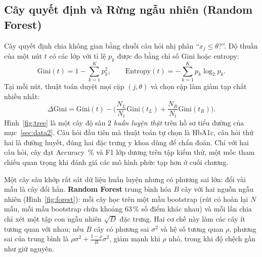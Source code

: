 
\subsection{Cây quyết định và Rừng ngẫu nhiên (Random Forest)}

Cây quyết định chia không gian bằng chuỗi câu hỏi nhị phân “$x_j \le \theta$?”. Độ thuần của một nút $t$ có các lớp với tỉ
lệ $p_k$ được đo bằng chỉ số Gini hoặc entropy:
\begin{equation}
  \mathrm{Gini}(t) = 1 - \sum_{k=1}^{K} p_k^2, \qquad \mathrm{Entropy}(t) = -\sum_{k=1}^{K} p_k\log_2 p_k .
\end{equation}
Tại mỗi nút, thuật toán duyệt mọi cặp $(j, \theta)$ và chọn cặp làm giảm tạp chất nhiều nhất:
\begin{equation}
  \Delta\mathrm{Gini} = \mathrm{Gini}(t) - \Big(\frac{N_L}{N_t}\mathrm{Gini}(t_L) + \frac{N_R}{N_t}\mathrm{Gini}(t_R)\Big).
\end{equation}
Hình~\ref{fig:tree} là một cây độ sâu 2 \emph{huấn luyện thật} trên  hồ sơ tiểu đường của
mục~\ref{sec:data2}. Câu hỏi đầu tiên mà thuật toán tự chọn là HbA1c, câu hỏi thứ hai là đường huyết, đúng hai đặc trưng
y khoa dùng để chẩn đoán. Chỉ với hai câu hỏi, cây đạt Accuracy \,\% và F1 lớp dương
 trên tập kiểm thử, một mốc tham chiếu quan trọng khi đánh giá các mô hình phức tạp hơn ở cuối
chương.


Một cây sâu khớp rất sát dữ liệu huấn luyện nhưng có phương sai lớn: đổi vài mẫu là cây đổi hẳn. \textbf{Random Forest}
\cite{breiman2001} trung bình hóa $B$ cây với hai nguồn ngẫu nhiên (Hình~\ref{fig:forest}): mỗi cây học trên một mẫu
bootstrap (rút có hoàn lại $N$ mẫu, mỗi mẫu bootstrap chứa khoảng 63\,\% số điểm khác nhau) và mỗi lần chia chỉ xét một
tập con ngẫu nhiên $\sqrt{D}$ đặc trưng. Hai cơ chế này làm các cây ít tương quan với nhau; nếu $B$ cây có phương sai
$\sigma^2$ và hệ số tương quan $\rho$, phương sai của trung bình là $\rho\sigma^2 + \frac{1-\rho}{B}\sigma^2$, giảm mạnh
khi $\rho$ nhỏ, trong khi độ chệch gần như giữ nguyên.


